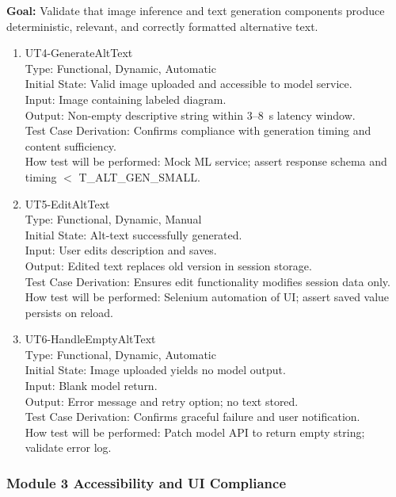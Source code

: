 \documentclass[12pt, titlepage]{article}
\begin{document}
\textbf{Goal:} Validate that image inference and text generation components produce deterministic, relevant, and correctly formatted alternative text.

\begin{enumerate}
\item{UT4-GenerateAltText\\}
Type: Functional, Dynamic, Automatic\\
Initial State: Valid image uploaded and accessible to model service.\\
Input: Image containing labeled diagram.\\
Output: Non-empty descriptive string within 3--8~s latency window.\\
Test Case Derivation: Confirms compliance with generation timing and content sufficiency.\\
How test will be performed: Mock ML service; assert response schema and timing $<$ T\_ALT\_GEN\_SMALL.

\item{UT5-EditAltText\\}
Type: Functional, Dynamic, Manual\\
Initial State: Alt-text successfully generated.\\
Input: User edits description and saves.\\
Output: Edited text replaces old version in session storage.\\
Test Case Derivation: Ensures edit functionality modifies session data only.\\
How test will be performed: Selenium automation of UI; assert saved value persists on reload.

\item{UT6-HandleEmptyAltText\\}
Type: Functional, Dynamic, Automatic\\
Initial State: Image uploaded yields no model output.\\
Input: Blank model return.\\
Output: Error message and retry option; no text stored.\\
Test Case Derivation: Confirms graceful failure and user notification.\\
How test will be performed: Patch model API to return empty string; validate error log.
\end{enumerate}

\subsubsection{Module 3 \textemdash{} Accessibility and UI Compliance}
\end{document}
